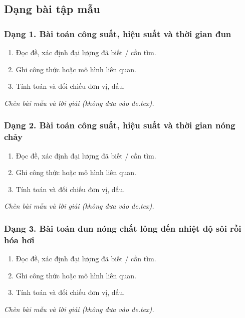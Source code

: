 

\subsection{Dạng bài tập mẫu}
\subsubsection{Dạng 1. Bài toán công suất, hiệu suất và thời gian đun}
\begin{phuongphap}
\begin{enumerate}
\item Đọc đề, xác định đại lượng đã biết / cần tìm.
\item Ghi công thức hoặc mô hình liên quan.
\item Tính toán và đối chiếu đơn vị, dấu.
\end{enumerate}
\end{phuongphap}
\begin{vidumau}
\textit{Chèn bài mẫu và lời giải (không đưa vào de.tex).}
\end{vidumau}

\subsubsection{Dạng 2. Bài toán công suất, hiệu suất và thời gian nóng chảy}
\begin{phuongphap}
\begin{enumerate}
\item Đọc đề, xác định đại lượng đã biết / cần tìm.
\item Ghi công thức hoặc mô hình liên quan.
\item Tính toán và đối chiếu đơn vị, dấu.
\end{enumerate}
\end{phuongphap}
\begin{vidumau}
\textit{Chèn bài mẫu và lời giải (không đưa vào de.tex).}
\end{vidumau}

\subsubsection{Dạng 3. Bài toán đun nóng chất lỏng đến nhiệt độ sôi rồi hóa hơi}
\begin{phuongphap}
\begin{enumerate}
\item Đọc đề, xác định đại lượng đã biết / cần tìm.
\item Ghi công thức hoặc mô hình liên quan.
\item Tính toán và đối chiếu đơn vị, dấu.
\end{enumerate}
\end{phuongphap}
\begin{vidumau}
\textit{Chèn bài mẫu và lời giải (không đưa vào de.tex).}
\end{vidumau}

